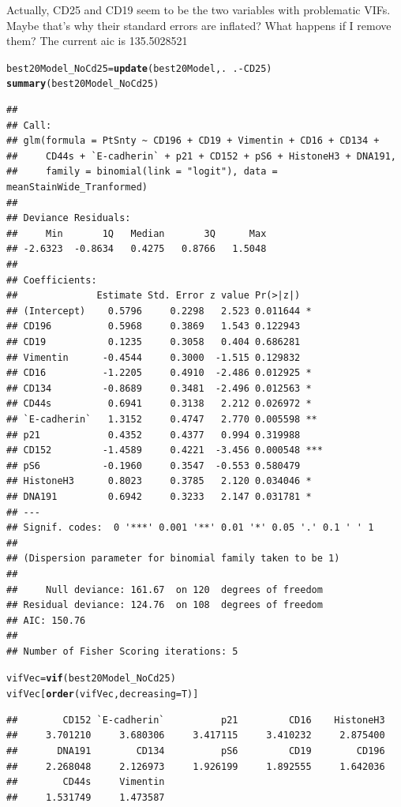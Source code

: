 \documentclass[a4paper]{article}\usepackage[]{graphicx}\usepackage[]{color}
\makeatletter
\newcommand{\hlopt}[1]{\textcolor[rgb]{0,0,0}{#1}}%
\newcommand{\hlstd}[1]{\textcolor[rgb]{0.345,0.345,0.345}{#1}}%
\newcommand{\hlkwb}[1]{\textcolor[rgb]{0.69,0.353,0.396}{#1}}%
\newcommand{\hlkwc}[1]{\textcolor[rgb]{0.333,0.667,0.333}{#1}}%
\newcommand{\hlkwd}[1]{\textcolor[rgb]{0.737,0.353,0.396}{\textbf{#1}}}%
\newenvironment{kframe}{%
 \def\at@end@of@kframe{}%
 \ifinner\ifhmode%
  \def\at@end@of@kframe{\end{minipage}}%
  \begin{minipage}{\columnwidth}%
 \fi\fi%
 \def\FrameCommand##1{\hskip\@totalleftmargin \hskip-\fboxsep
 \colorbox{shadecolor}{##1}\hskip-\fboxsep
     \hskip-\linewidth \hskip-\@totalleftmargin \hskip\columnwidth}%
 \MakeFramed {\advance\hsize-\width
   \@totalleftmargin\z@ \linewidth\hsize
   \@setminipage}}%
 {\par\unskip\endMakeFramed%
 \at@end@of@kframe}
\newenvironment{knitrout}{}{} %
\makeatother
\begin{document}
Actually, CD25 and CD19 seem to be the two variables with problematic VIFs. Maybe that's why their standard errors are inflated? What happens if I remove them? The current aic is 135.5028521

\begin{knitrout}
\color{fgcolor}\begin{kframe}
\begin{alltt}
\hlstd{best20Model_NoCd25} \hlkwb{=} \hlkwd{update}\hlstd{(best20Model,.}\hlopt{~}\hlstd{.}\hlopt{-}\hlstd{CD25)}
\hlkwd{summary}\hlstd{(best20Model_NoCd25)}
\end{alltt}
\begin{verbatim}
## 
## Call:
## glm(formula = PtSnty ~ CD196 + CD19 + Vimentin + CD16 + CD134 + 
##     CD44s + `E-cadherin` + p21 + CD152 + pS6 + HistoneH3 + DNA191, 
##     family = binomial(link = "logit"), data = meanStainWide_Tranformed)
## 
## Deviance Residuals: 
##     Min       1Q   Median       3Q      Max  
## -2.6323  -0.8634   0.4275   0.8766   1.5048  
## 
## Coefficients:
##              Estimate Std. Error z value Pr(>|z|)    
## (Intercept)    0.5796     0.2298   2.523 0.011644 *  
## CD196          0.5968     0.3869   1.543 0.122943    
## CD19           0.1235     0.3058   0.404 0.686281    
## Vimentin      -0.4544     0.3000  -1.515 0.129832    
## CD16          -1.2205     0.4910  -2.486 0.012925 *  
## CD134         -0.8689     0.3481  -2.496 0.012563 *  
## CD44s          0.6941     0.3138   2.212 0.026972 *  
## `E-cadherin`   1.3152     0.4747   2.770 0.005598 ** 
## p21            0.4352     0.4377   0.994 0.319988    
## CD152         -1.4589     0.4221  -3.456 0.000548 ***
## pS6           -0.1960     0.3547  -0.553 0.580479    
## HistoneH3      0.8023     0.3785   2.120 0.034046 *  
## DNA191         0.6942     0.3233   2.147 0.031781 *  
## ---
## Signif. codes:  0 '***' 0.001 '**' 0.01 '*' 0.05 '.' 0.1 ' ' 1
## 
## (Dispersion parameter for binomial family taken to be 1)
## 
##     Null deviance: 161.67  on 120  degrees of freedom
## Residual deviance: 124.76  on 108  degrees of freedom
## AIC: 150.76
## 
## Number of Fisher Scoring iterations: 5
\end{verbatim}
\begin{alltt}
\hlstd{vifVec} \hlkwb{=} \hlkwd{vif}\hlstd{(best20Model_NoCd25)}
\hlstd{vifVec[}\hlkwd{order}\hlstd{(vifVec,}\hlkwc{decreasing}\hlstd{=T)]}
\end{alltt}
\begin{verbatim}
##        CD152 `E-cadherin`          p21         CD16    HistoneH3 
##     3.701210     3.680306     3.417115     3.410232     2.875400 
##       DNA191        CD134          pS6         CD19        CD196 
##     2.268048     2.126973     1.926199     1.892555     1.642036 
##        CD44s     Vimentin 
##     1.531749     1.473587
\end{verbatim}
\end{kframe}
\end{knitrout}
\end{document}
